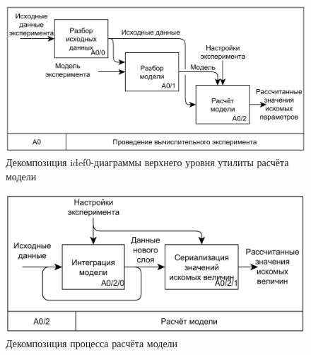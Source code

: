 \begin{figure}
    \centering
    \includegraphics[width=.7\textwidth]{img/idef0/L1}
    \caption{Декомпозиция idef0-диаграммы верхнего уровня утилиты расчёта 
        модели}
    \label{fig:idef0-L1}
\end{figure}

\begin{figure}
    \centering
    \includegraphics[width=.7\textwidth]{img/idef0/L2}
    \caption{Декомпозиция процесса расчёта модели}
    \label{fig:idef0-L2}
\end{figure}

